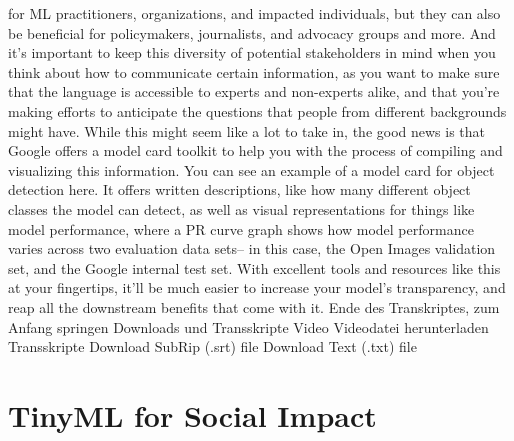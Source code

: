 {{{{{{{{    for ML practitioners, organizations, and impacted individuals,
    but they can also be beneficial for policymakers, journalists, and advocacy
    groups and more.
    And it's important to keep this diversity of potential stakeholders
    in mind when you think about how to communicate certain information,
    as you want to make sure that the language is accessible to experts
    and non-experts alike, and that you're making efforts
    to anticipate the questions that people from different backgrounds might have.
    While this might seem like a lot to take in,
    the good news is that Google offers a model card
    toolkit to help you with the process of compiling and visualizing
    this information.
    You can see an example of a model card for object detection here.
    It offers written descriptions, like how many different object classes the model
    can detect, as well as visual representations
    for things like model performance, where a PR curve
    graph shows how model performance varies across two evaluation data
    sets-- in this case, the Open Images validation set,
    and the Google internal test set.
    With excellent tools and resources like this at your fingertips,
    it'll be much easier to increase your model's transparency,
    and reap all the downstream benefits that come with it.
    Ende des Transkriptes, zum Anfang springen
    Downloads und Transskripte
    Video
    Videodatei herunterladen
    Transskripte
    Download SubRip (.srt) file
    Download Text (.txt) file
  
\section{TinyML for Social Impact}

}}}}}}}}
